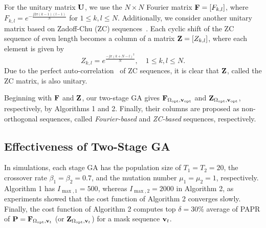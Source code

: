 \documentclass[journal]{IEEEtran}
\newcommand{\vbu}{{\bf v}}
\newcommand{\Hbu}{{\bf H}}
\newcommand{\Fbu}{{\bf F}}
\newcommand{\Mbu}{{\bf M}}
\newcommand{\Pbu}{{\bf P}}
\newcommand{\Ubu}{{\bf U}}
\newcommand{\Zbu}{{\bf Z}}
\numberwithin{const2}{const}
\begin{document}
For the unitary matrix $\Ubu$, %
we use the $N \times N$ Fourier matrix $\Fbu = [F_{k,l}]$,
where
$F_{k,l} = e^{-\frac{j 2 \pi (k-1)(l-1)}{N}}$ 
for $1 \leq k, l \leq N$.
Additionally, we consider another unitary matrix based on Zadoff-Chu (ZC) sequences~\cite{Chu:ZC}.
Each cyclic shift of the ZC sequence of even length %
becomes a column of a matrix $\Zbu = [Z_{k,l}]$,
where each element is given by
\[
Z_{k, l} = e^{\frac{-j \pi (k+N-l)^2}{N} }, \quad 1 \leq k, l \leq N.
\]
Due to the perfect auto-correlation~\cite{Chu:ZC} of ZC sequences,
it is clear that
$\Zbu$, called the ZC matrix, is also unitary.


Beginning with $\Fbu$ and $\Zbu$, 
our two-stage GA gives
$\Fbu_{\Omega_{\rm opt}, \vbu_{\rm opt}}$ and $\Zbu_{\Omega_{\rm opt}, \vbu_{\rm opt}}$, 
respectively, by Algorithms 1 and 2. %
Finally, their columns are
proposed as non-orthogonal sequences, called 
\emph{Fourier-based} and \emph{ZC-based}
sequences, respectively.


\subsection{Effectiveness of Two-Stage GA}
In simulations, %
each stage GA has the population size of $T_1 = T_2 = 20$,
the crossover rate $\beta_1 = \beta_2 = 0.7$, and the mutation number $\mu_1 = \mu_2 = 1$, respectively.
Algorithm 1 has $I_{\max, 1} = 500$,
whereas $I_{\max, 2} = 2000$ in Algorithm 2, as experiments showed that the cost function of Algorithm 2
converges slowly. %
Finally, the cost function of Algorithm 2 computes %
top $\delta = 30 \%$ average of PAPR of $\Pbu= \Fbu_{\Omega_{\rm opt}, \vbu_t} $
(or $\Zbu_{\Omega_{\rm opt}, \vbu_t} $)
for a mask sequence $\vbu_t$.
\end{document}
